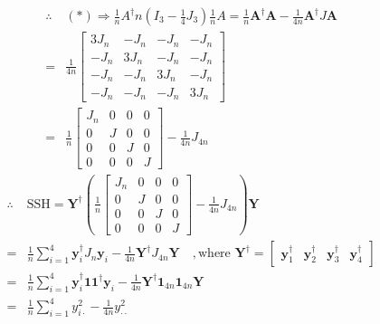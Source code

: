 \documentclass{article}
\begin{document}
\begin{eqnarray*}
&\therefore &\left( \ast \right) \Rightarrow \frac{1}{n}A^{\dagger }n\left(
I_{3}-\frac{1}{4}J_{3}\right) \frac{1}{n}A=\frac{1}{n}\mathbf{A}^{\dagger }%
\mathbf{A-}\frac{1}{4n}\mathbf{A}^{\dagger }J\mathbf{A} \\
&=&\frac{1}{4n}\left[ 
\begin{array}{cccc}
3J_{n} & -J_{n} & -J_{n} & -J_{n} \\ 
-J_{n} & 3J_{n} & -J_{n} & -J_{n} \\ 
-J_{n} & -J_{n} & 3J_{n} & -J_{n} \\ 
-J_{n} & -J_{n} & -J_{n} & 3J_{n}%
\end{array}%
\right]  \\
&=&\frac{1}{n}\left[ 
\begin{array}{cccc}
J_{n} & 0 & 0 & 0 \\ 
0 & J & 0 & 0 \\ 
0 & 0 & J & 0 \\ 
0 & 0 & 0 & J%
\end{array}%
\right] -\frac{1}{4n}J_{4n}
\end{eqnarray*}%
\begin{eqnarray*}
&\therefore &\text{SSH}=\mathbf{Y}^{\dagger }\left( \frac{1}{n}\left[ 
\begin{array}{cccc}
J_{n} & 0 & 0 & 0 \\ 
0 & J & 0 & 0 \\ 
0 & 0 & J & 0 \\ 
0 & 0 & 0 & J%
\end{array}%
\right] -\frac{1}{4n}J_{4n}\right) \mathbf{Y} \\
&=&\frac{1}{n}\sum\limits_{i=1}^{4}\mathbf{y}_{i}^{\dagger }J_{n}\mathbf{y}%
_{i}-\frac{1}{4n}\mathbf{Y}^{\dagger }J_{4n}\mathbf{Y\quad ,}\text{where }%
\mathbf{Y}^{\dagger }=\left[ 
\begin{array}{cccc}
\mathbf{y}_{1}^{\dagger } & \mathbf{y}_{2}^{\dagger } & \mathbf{y}%
_{3}^{\dagger } & \mathbf{y}_{4}^{\dagger }%
\end{array}%
\right]  \\
&=&\frac{1}{n}\sum\limits_{i=1}^{4}\mathbf{y}_{i}^{\dagger }\mathbf{11}%
^{\dagger }\mathbf{y}_{i}-\frac{1}{4n}\mathbf{Y}^{\dagger }\mathbf{1}_{4n}%
\mathbf{1}_{4n}\mathbf{Y} \\
&=&\frac{1}{n}\sum\limits_{i=1}^{4}y_{i\cdot }^{2}-\frac{1}{4n}y_{\cdot
\cdot }^{2}
\end{eqnarray*}%
\end{document}
